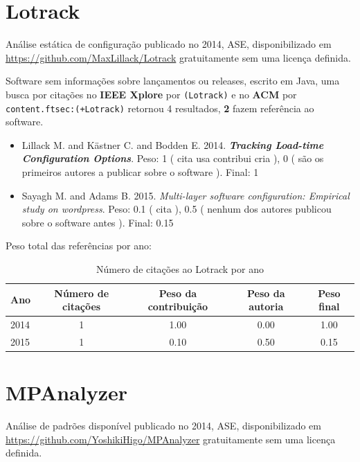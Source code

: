 \section{Lotrack}

Análise estática de configuração
publicado no 2014, ASE,
disponibilizado em \url{https://github.com/MaxLillack/Lotrack}
gratuitamente
sem uma licença definida.

Software sem informações sobre lançamentos ou releases,
escrito em Java,
uma busca por citações no {\bf IEEE Xplore} por
\texttt{(Lotrack)}
e no {\bf ACM} por
\texttt{content.ftsec:(+Lotrack)}
retornou
4 resultados,
{\bf 2} fazem referência ao software.

\begin{itemize}
\item Lillack M. and K\"{a}stner C. and Bodden E.
      2014.
        \textbf{\textit{ Tracking Load-time Configuration Options}}.
      Peso:
      1 (
          cita
          usa
          contribui
          cria
      ),
      0 (
são os primeiros autores a publicar sobre o software
      ).
      Final:
      1

\item Sayagh M. and Adams B.
      2015.
        \textit{ Multi-layer software configuration: Empirical study on wordpress}.
      Peso:
      0.1 (
          cita
      ),
      0.5 (
nenhum dos autores publicou sobre o software antes
      ).
      Final:
      0.15

\end{itemize}

Peso total das referências por ano:

\begin{table}[h]
\caption{Número de citações ao Lotrack por ano}
\centering
\begin{tabular}{| l | c | c | c | c |}
  \hline
  Ano & Número de citações & Peso da contribuição & Peso da autoria & Peso final \\
  \hline
  2014
    & 1
    & 1.00
    & 0.00
    & 1.00 \\
  2015
    & 1
    & 0.10
    & 0.50
    & 0.15 \\
  \hline
\end{tabular}
\end{table}


\section{MPAnalyzer}

Análise de padrões disponível
publicado no 2014, ASE,
disponibilizado em \url{https://github.com/YoshikiHigo/MPAnalyzer}
gratuitamente
sem uma licença definida.

